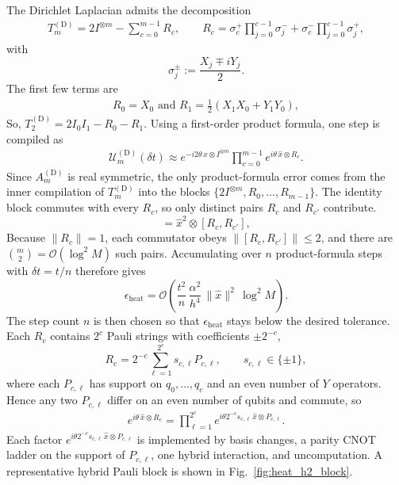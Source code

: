\documentclass{article}
\begin{document}
The Dirichlet Laplacian admits the decomposition
\begin{align}
    T_m^{(\mathrm D)} = 2I^{\otimes m} - \sum_{c=0}^{m-1} R_c,
    \qquad
    R_c = \sigma_c^+ \prod_{j=0}^{c-1}\sigma_j^- + \sigma_c^- \prod_{j=0}^{c-1}\sigma_j^+,
\end{align}
with
\[
\sigma_j^\pm := \frac{X_j \mp iY_j}{2}.
\]
The first few terms are
\begin{align}
    R_0 = X_0 \text{ and } R_1 = \frac{1}{2}\left(X_1X_0 + Y_1Y_0\right), 
\end{align}
So, $T_2^{(\mathrm D)} = 2 I_0 I_1 -  R_0 - R_1$. Using a first-order product formula, one step is compiled as
\begin{align}
    \mathcal U_m^{(\mathrm D)}(\delta t)
    \approx
    e^{-i2\theta\,\hat x \otimes I^{\otimes m}}
    \prod_{c=0}^{m-1} e^{i\theta\,\hat x \otimes R_c}.
\end{align}
Since $A_m^{(\mathrm D)}$ is real symmetric, the only product-formula error comes from the inner compilation of $T_m^{(\mathrm D)}$ into the blocks $\{2I^{\otimes m}, R_0,\dots,R_{m-1}\}$. The identity block commutes with every $R_c$, so only distinct pairs $R_c$ and $R_{c'}$ contribute.
\begin{equation}
    [\hat{x}\otimes R_c,\;\hat{x}\otimes R_{c'}]=\hat{x}^2\otimes[R_c,R_{c'}],
\end{equation}
Because $\|R_c\|=1$, each commutator obeys $\|[R_c,R_{c'}]\|\le 2$, and there are $\binom{m}{2}=\mathcal{O}(\log^2 M)$ such pairs. Accumulating over $n$ product-formula steps with $\delta t=t/n$ therefore gives
\begin{equation}
    \epsilon_{\mathrm{heat}}=\mathcal{O}\!\left(\frac{t^2}{n}\,\frac{\alpha^2}{h^4}\,\|\hat{x}\|^2\,\log^2 M\right).
    \label{eq:heat-trotter-error}
\end{equation}
The step count $n$ is then chosen so that $\epsilon_{\mathrm{heat}}$ stays below the desired tolerance.
Each $R_c$ contains $2^c$ Pauli strings with coefficients $\pm 2^{-c}$,
\[
R_c = 2^{-c}\sum_{\ell=1}^{2^c}s_{c,\ell}P_{c,\ell},
\qquad
s_{c,\ell}\in\{\pm 1\},
\]
where each $P_{c,\ell}$ has support on $q_0,\dots,q_c$ and an even number of $Y$ operators. Hence any two $P_{c,\ell}$ differ on an even number of qubits and commute, so
\begin{align}
    e^{i\theta\,\hat x\otimes R_c}
    =
    \prod_{\ell=1}^{2^c}
    e^{i\theta 2^{-c}s_{c,\ell}\,\hat x\otimes P_{c,\ell}}.
\end{align}
Each factor $e^{i\theta 2^{-c}s_{c,\ell}\,\hat x\otimes P_{c,\ell}}$ is implemented by basis changes, a parity CNOT ladder on the support of $P_{c,\ell}$, one hybrid interaction, and uncomputation. A representative hybrid Pauli block is shown in Fig.~\ref{fig:heat_h2_block}.
\end{document}
